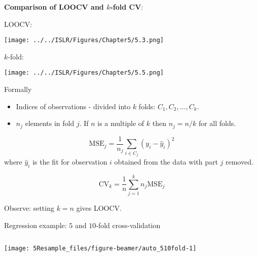 \documentclass[10pt,ignorenonframetext,]{beamer}
\providecommand{\tightlist}{%
  \setlength{\itemsep}{0pt}\setlength{\parskip}{0pt}}
\begin{document}
\begin{frame}

\textbf{Comparison of LOOCV and \(k\)-fold CV}:

\centering

LOOCV:

\texttt{[image: ../../ISLR/Figures/Chapter5/5.3.png]}

\(k\)-fold:

\texttt{[image: ../../ISLR/Figures/Chapter5/5.5.png]}

\end{frame}

\begin{frame}

\begin{block}{Formally}

\begin{itemize}
\tightlist
\item
  Indices of observations - divided into \(k\) folds:
  \(C_1, C_2, \ldots, C_k\).
\item
  \(n_j\) elements in fold \(j\). If \(n\) is a multiple of \(k\) then
  \(n_j=n/k\) for all folds.
\end{itemize}

\[\text{MSE}_j=\frac{1}{n_j}\sum_{i\in C_j}(y_i-\hat{y}_i)^2\] where
\(\hat{y}_i\) is the fit for observation \(i\) obtained from the data
with part \(j\) removed.

\[\text{CV}_{k}=\frac{1}{n} \sum_{j=1}^k n_j \text{MSE}_j\]

Observe: setting \(k=n\) gives LOOCV.

\end{block}

\end{frame}

\begin{frame}

\begin{block}{Regression example: \(5\) and \(10\)-fold
cross-validation}

\(~\)

\begin{center}\texttt{[image: 5Resample\_files/figure-beamer/auto\_510fold-1]} \end{center}

\normalsize

\end{block}

\end{frame}
\end{document}
